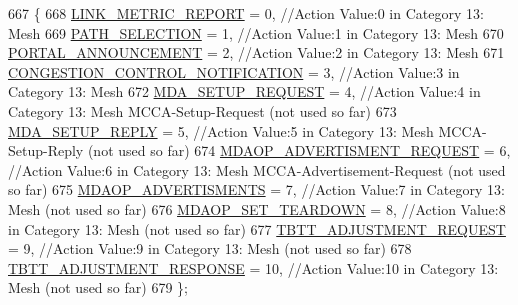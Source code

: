 \begin{DoxyCode}
667   \{
668     \hyperlink{classns3_1_1WifiActionHeader_a7dec260ba924574c5abb38c1d8a562b1a665a0ea40f45970b6905243a471f60a3}{LINK\_METRIC\_REPORT} = 0,               \textcolor{comment}{//Action Value:0 in Category 13: Mesh}
669     \hyperlink{classns3_1_1WifiActionHeader_a7dec260ba924574c5abb38c1d8a562b1aa04b0ca401da079d9d961d29f2f9854f}{PATH\_SELECTION} = 1,                   \textcolor{comment}{//Action Value:1 in Category 13: Mesh}
670     \hyperlink{classns3_1_1WifiActionHeader_a7dec260ba924574c5abb38c1d8a562b1ab3a41fe1a59cd44192377e8a3076c89e}{PORTAL\_ANNOUNCEMENT} = 2,              \textcolor{comment}{//Action Value:2 in Category 13: Mesh}
671     \hyperlink{classns3_1_1WifiActionHeader_a7dec260ba924574c5abb38c1d8a562b1a29181aa6a9cc4e12d03b749750fe1ff8}{CONGESTION\_CONTROL\_NOTIFICATION} = 3,  \textcolor{comment}{//Action Value:3 in Category 13:
       Mesh}
672     \hyperlink{classns3_1_1WifiActionHeader_a7dec260ba924574c5abb38c1d8a562b1a13b27cfc684f3a86aa03209aa3aae6c1}{MDA\_SETUP\_REQUEST} = 4,                \textcolor{comment}{//Action Value:4 in Category 13: Mesh
       MCCA-Setup-Request (not used so far)}
673     \hyperlink{classns3_1_1WifiActionHeader_a7dec260ba924574c5abb38c1d8a562b1a5872a1e2e716026b96db0dab35a05d98}{MDA\_SETUP\_REPLY} = 5,                  \textcolor{comment}{//Action Value:5 in Category 13: Mesh
       MCCA-Setup-Reply (not used so far)}
674     \hyperlink{classns3_1_1WifiActionHeader_a7dec260ba924574c5abb38c1d8a562b1a3dc87b2e25545497995f3c2e08be9cfb}{MDAOP\_ADVERTISMENT\_REQUEST} = 6,       \textcolor{comment}{//Action Value:6 in Category 13: Mesh
       MCCA-Advertisement-Request (not used so far)}
675     \hyperlink{classns3_1_1WifiActionHeader_a7dec260ba924574c5abb38c1d8a562b1a28a11422c58f781cf30f2cb910f1a119}{MDAOP\_ADVERTISMENTS} = 7,              \textcolor{comment}{//Action Value:7 in Category 13: Mesh (not
       used so far)}
676     \hyperlink{classns3_1_1WifiActionHeader_a7dec260ba924574c5abb38c1d8a562b1a67217da6d636152401eae2636b2c4cbd}{MDAOP\_SET\_TEARDOWN} = 8,               \textcolor{comment}{//Action Value:8 in Category 13: Mesh (not used
       so far)}
677     \hyperlink{classns3_1_1WifiActionHeader_a7dec260ba924574c5abb38c1d8a562b1aa5fc5d8099e8297818555decb8b6badd}{TBTT\_ADJUSTMENT\_REQUEST} = 9,          \textcolor{comment}{//Action Value:9 in Category 13: Mesh (not
       used so far)}
678     \hyperlink{classns3_1_1WifiActionHeader_a7dec260ba924574c5abb38c1d8a562b1a47d16ede15f09d2d61404bedec729ae3}{TBTT\_ADJUSTMENT\_RESPONSE} = 10,        \textcolor{comment}{//Action Value:10 in Category 13: Mesh
       (not used so far)}
679   \};
\end{DoxyCode}
